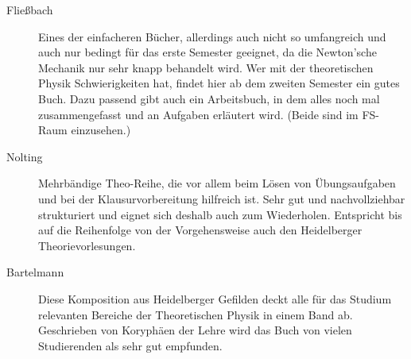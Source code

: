 \begin{description}



\item[Fließbach]{
Eines der einfacheren Bücher, allerdings auch nicht so umfangreich
und auch nur bedingt für das erste Semester geeignet, da die Newton'sche Mechanik
nur sehr knapp behandelt wird. Wer mit der theoretischen Physik 
Schwierigkeiten hat, findet hier ab dem zweiten Semester ein gutes Buch.
Dazu passend gibt auch ein Arbeitsbuch, in dem alles noch mal zusammengefasst
und an Aufgaben erläutert wird. (Beide sind im FS-Raum einzusehen.)}


\item[Nolting]{Mehrbändige Theo-Reihe, die vor allem beim Lösen von
Übungsaufgaben und bei der Klausurvorbereitung hilfreich ist. Sehr
gut und nachvollziehbar strukturiert und eignet sich deshalb auch
zum Wiederholen. Entspricht bis auf die Reihenfolge von der
Vorgehensweise auch den Heidelberger Theorievorlesungen.
}

\item[Bartelmann]{Diese Komposition aus Heidelberger Gefilden deckt
alle für das Studium relevanten Bereiche der Theoretischen Physik in
einem Band ab. Geschrieben von Koryphäen der Lehre wird das Buch von
vielen Studierenden als sehr gut empfunden.}


\end{description}


